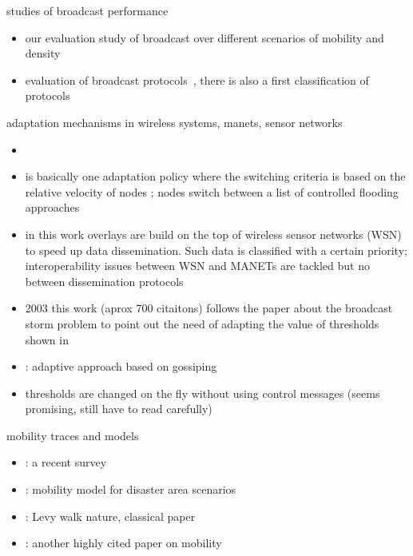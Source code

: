 studies of broadcast performance
	\begin{itemize}
		\item \cite{DensityMobDrivenEval} our evaluation study of broadcast over different scenarios of mobility and density
		\item evaluation of broadcast protocols~\cite{Williams2002}, there is also a first classification of protocols
	\end{itemize}


adaptation mechanisms in wireless systems, manets, sensor networks
	\begin{itemize}
		\item \cite{adaptive-multihop}
		\item \cite{adaptive_group_com_iscc02} is basically one adaptation policy where the switching criteria is based on the relative velocity of nodes ; nodes switch between a list of controlled flooding approaches
		\item in this work \cite{Bellavista2013} overlays are build on the top of wireless sensor networks (WSN) to speed up data dissemination. Such data is classified with a certain priority; interoperability issues between WSN and MANETs are tackled but no between dissemination protocols
		\item 2003 \cite{2001:AAR:876878.879323} this work (aprox 700 citaitons) follows the paper about the broadcast storm problem to point out the need of adapting the value of thresholds shown in \cite{BroadcastStormProblem}
		\item \cite{hypergossiping} : adaptive approach based on gossiping
		\item \cite{prob-based-adaptive-tech} thresholds are changed on the fly without using control messages (seems promising, still have to read carefully)
	\end{itemize}



mobility traces and models
	\begin{itemize} 
		\item \cite{Hess:2015:DHM:2856149.2840722}: a recent survey
		\item \cite{Aschenbruck2009}: mobility model for disaster area scenarios
		\item \cite{rhee2011levy}: Levy walk nature, classical paper
		\item \cite{jardosh2003towards}: another highly cited paper on mobility
	\end{itemize}

